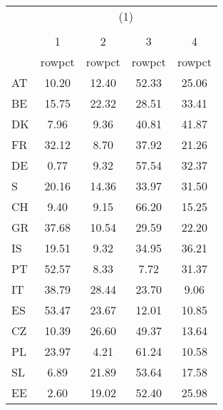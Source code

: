 {
\def\sym#1{\ifmmode^{#1}\else\(^{#1}\)\fi}
\begin{tabular}{l*{4}{c}}
\hline\hline
            &\multicolumn{4}{c}{(1)}                            \\
            &\multicolumn{4}{c}{}                               \\
            &           1&           2&           3&           4\\
            &      rowpct&      rowpct&      rowpct&      rowpct\\
\hline
AT          &       10.20&       12.40&       52.33&       25.06\\
BE          &       15.75&       22.32&       28.51&       33.41\\
DK          &        7.96&        9.36&       40.81&       41.87\\
FR          &       32.12&        8.70&       37.92&       21.26\\
DE          &        0.77&        9.32&       57.54&       32.37\\
S           &       20.16&       14.36&       33.97&       31.50\\
CH          &        9.40&        9.15&       66.20&       15.25\\
GR          &       37.68&       10.54&       29.59&       22.20\\
IS          &       19.51&        9.32&       34.95&       36.21\\
PT          &       52.57&        8.33&        7.72&       31.37\\
IT          &       38.79&       28.44&       23.70&        9.06\\
ES          &       53.47&       23.67&       12.01&       10.85\\
CZ          &       10.39&       26.60&       49.37&       13.64\\
PL          &       23.97&        4.21&       61.24&       10.58\\
SL          &        6.89&       21.89&       53.64&       17.58\\
EE          &        2.60&       19.02&       52.40&       25.98\\
\hline\hline
\end{tabular}
}
